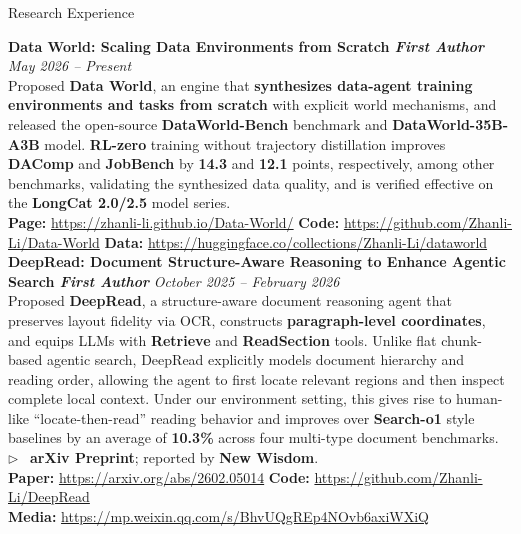 \documentclass{resume}
\begin{document}

\begin{rSection}{Research Experience}

{\bf Data World: Scaling Data Environments from Scratch \quad \textit{First Author}} \hfill {\em May 2026 -- Present} \\
Proposed \textbf{Data World}, an engine that \textbf{synthesizes data-agent training environments and tasks from scratch} with explicit world mechanisms, and released the open-source \textbf{DataWorld-Bench} benchmark and \textbf{DataWorld-35B-A3B} model. \textbf{RL-zero} training without trajectory distillation improves \textbf{DAComp} and \textbf{JobBench} by \textbf{14.3} and \textbf{12.1} points, respectively, among other benchmarks, validating the synthesized data quality, and is verified effective on the \textbf{LongCat 2.0/2.5} model series. \\[-2pt]
{\scriptsize \textbf{Page:} \url{https://zhanli-li.github.io/Data-World/} \quad \textbf{Code:} \url{https://github.com/Zhanli-Li/Data-World} \quad \textbf{Data:} \url{https://huggingface.co/collections/Zhanli-Li/dataworld}}\\[-6pt]

{\bf DeepRead: Document Structure-Aware Reasoning to Enhance Agentic Search \quad \textit{First Author}} \hfill {\em October 2025 -- February 2026} \\
Proposed \textbf{DeepRead}, a structure-aware document reasoning agent that preserves layout fidelity via OCR, constructs \textbf{paragraph-level coordinates}, and equips LLMs with \textbf{Retrieve} and \textbf{ReadSection} tools. Unlike flat chunk-based agentic search, DeepRead explicitly models document hierarchy and reading order, allowing the agent to first locate relevant regions and then inspect complete local context. Under our environment setting, this gives rise to human-like ``locate-then-read'' reading behavior and improves over \textbf{Search-o1} style baselines by an average of \textbf{10.3\%} across four multi-type document benchmarks. \\
$\triangleright$~ \textbf{arXiv Preprint}; reported by \textbf{New Wisdom}. \\[-2pt]
{\scriptsize \textbf{Paper:} \url{https://arxiv.org/abs/2602.05014} \quad \textbf{Code:} \url{https://github.com/Zhanli-Li/DeepRead}}\\[-2pt]
{\scriptsize \textbf{Media:} \url{https://mp.weixin.qq.com/s/BhvUQgREp4NOvb6axiWXiQ}}\\[-6pt]


\end{rSection}
\end{document}
